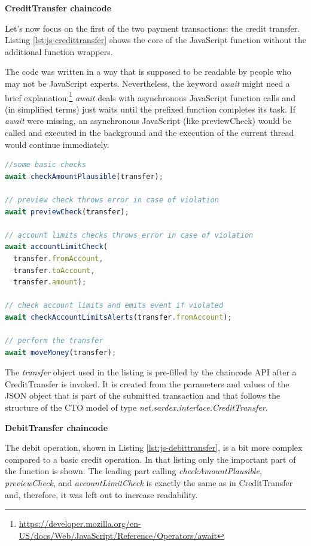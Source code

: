 \textbf{CreditTransfer chaincode}

Let's now focus on the first of the two payment transactions: the credit transfer. Listing \ref{lst:js-credittransfer} shows the core of the JavaScript function without the additional function wrappers.

The code was written in a way that is supposed to be readable by people who may not be JavaScript experts. Nevertheless, the keyword \textit{await} might  need a brief explanation:\footnote{\url{https://developer.mozilla.org/en-US/docs/Web/JavaScript/Reference/Operators/await}} \textit{await} deals with asynchronous JavaScript function calls and (in simplified terms) just waits until the prefixed function completes its task. If \textit{await} were missing, an asynchronous JavaScript (like previewCheck) would be called and executed in the background and the execution of the current thread would continue immediately.

\begin{center}
\begin{minipage}{0.8\textwidth}
\small
\begin{lstlisting}[language=javascript,firstnumber=1,caption={\bf\small CreditTransfer JavaScript}, captionpos=b,label=lst:js-credittransfer]
//some basic checks
await checkAmountPlausible(transfer);

// preview check throws error in case of violation
await previewCheck(transfer);

// account limits checks throws error in case of violation
await accountLimitCheck(
  transfer.fromAccount,
  transfer.toAccount,
  transfer.amount);

// check account limits and emits event if violated
await checkAccountLimitsAlerts(transfer.fromAccount);

// perform the transfer
await moveMoney(transfer);
\end{lstlisting}
\end{minipage}
\end{center}

The \textit{transfer} object used in the listing is pre-filled by the chaincode API after a CreditTransfer is invoked. It is created from the parameters and values of the JSON object that is part of the submitted transaction and that follows the structure of the CTO model of type \textit{net.sardex.interlace.CreditTransfer}.

\textbf{DebitTransfer chaincode}

The debit operation, shown in Listing \ref{lst:js-debittransfer}, is a bit more complex compared to a basic credit operation. In that listing only the important part of the function is shown. The leading part calling \textit{checkAmountPlausible}, \textit{previewCheck}, and \textit{accountLimitCheck} is exactly the same as in CreditTransfer and, therefore, it was left out to increase readability.

